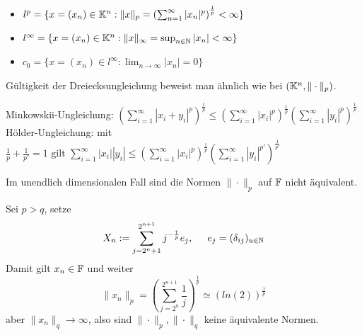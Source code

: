 \begin{beispiel}
	\begin{itemize}
		\item $l^{p} = \{ x = (x_{n}) \in \mathbb{K}^n: \|x\|_{p} = \left( \sum_{n = 1}^{\infty} | x_{n} |^{p}\right)^{\frac{1}{p}} < \infty \}$
		\item $l^{\infty} = \{ x = (x_{n}) \in \mathbb{K}^n: \|x\|_{\infty} = \sup_{n \in \mathbb{N}} |x_{n}| < \infty \}$
		\item $c_{0} = \{ x = (x_{n}) \in l^{\infty}: \lim_{n \rightarrow \infty} |x_{n}| = 0 \}$
	\end{itemize}
Gültigkeit der Dreiecksungleichung beweist man ähnlich wie bei $(\mathbb{K}^{n}, \| \cdot \|_{p})$.
\end{beispiel}

\begin{lemma}
Minkowskii-Ungleichung: $\left( \sum_{i=1}^{\infty} |x_{i} + y_{i}|^p\right)^{\frac{1}{p}} \leq\left( \sum_{i=1}^{\infty} |x_{i}|^p\right)^{\frac{1}{p}} \left( \sum_{i=1}^{\infty} |y_{i}|^p\right)^{\frac{1}{p}} $	\\
Hölder-Ungleichung: mit $\frac{1}{p} + \frac{1}{p'} = 1 \text{ gilt } \sum_{i=1}^{\infty} |x_{i}| |y_{i}| \leq \left( \sum_{i=1}^{\infty} |x_{i}|^{p} \right)^{\frac{1}{p}} \left( \sum_{i=1}^{\infty} |y_{i}|^{p'} \right)^{\frac{1}{p'}} $	\\	
\end{lemma}

\begin{bemerkung}
	Im unendlich dimensionalen Fall sind die Normen $\| \cdot \|_{p}$ auf $\mathbb{F}$ nicht äquivalent.
	\begin{beweis}
		Sei $p > q$, setze 
		\[ X_{n} := \sum_{j = 2^{n} + 1}^{2^{n + 1}} j^{-\frac{1}{p}}e_{j}, \hspace{0.5cm} e_{j} = ( \delta_{ij} )_{u \in \mathbb{N}} \]
		Damit gilt $x_{n} \in \mathbb{F}$ und weiter
		\[ \| x_{n} \|_{p} = \left( \sum_{j = 2^{n}}^{2^{n + 1}} \frac{1}{j} \right)^{\frac{1}{p}} \simeq \left( ln(2) \right)^{\frac{1}{p}} \]
		aber $\| x_{n} \|_{q} \rightarrow \infty$, also sind $\| \cdot \|_{p}, \| \cdot \|_{q}$ keine äquivalente Normen.
	\end{beweis}	
\end{bemerkung}



